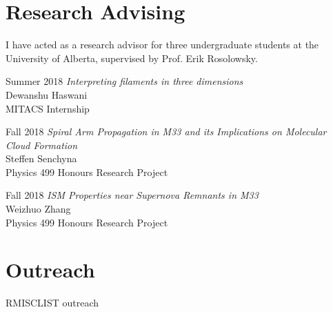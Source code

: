 \documentclass[letterpaper,11pt]{article}
\newlength{\mainindent} \setlength{\mainindent}{12pt}
\newlength{\contentindent} \setlength{\contentindent}{19ex}
\newenvironment{datelist}{
  \begingroup
  \raggedright
  \begin{description}[labelindent=\mainindent,leftmargin=\contentindent,
      style=sameline,font=\normalfont,topsep=0pt,partopsep=0pt,parsep=0pt,
      itemsep=4pt]
}{
  \end{description}
  \endgroup
}
\begin{document}
\section*{Research Advising}

I have acted as a research advisor for three undergraduate students at the University of Alberta, supervised by Prof. Erik Rosolowsky.
\vspace{0.1in}
\begin{datelist}
\item[Summer 2018]
  \emph{Interpreting filaments in three dimensions} \\
  Dewanshu Haswani \\
  MITACS Internship
\item[Fall 2018]
  \emph{Spiral Arm Propagation in M33 and its Implications on Molecular Cloud Formation} \\
  Steffen Senchyna \\
  Physics 499 Honours Research Project
\item[Fall 2018]
  \emph{ISM Properties near Supernova Remnants in M33} \\
  Weizhuo Zhang \\
  Physics 499 Honours Research Project
\end{datelist}





\section*{Outreach}
\begin{datelist}
RMISCLIST outreach
\end{datelist}
\end{document}
